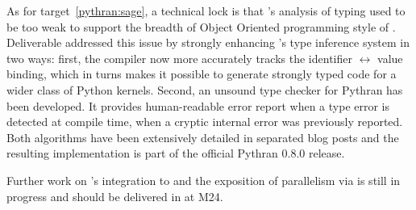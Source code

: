 \documentclass{deliverablereport}
\begin{document}
As for target~\ref{pythran:sage}, a technical lock is that \Pythran's analysis
of \Python typing used to be too weak to support the breadth of Object Oriented
programming style of \Sage. Deliverable 
addressed this issue by strongly enhancing \Pythran's type inference system in two ways: first, the compiler now more accurately tracks the identifier
$\leftrightarrow$ value binding, which in turns makes it possible to generate strongly
typed code for a wider class of Python kernels.  Second, an unsound type checker for
Pythran has been developed. It provides human-readable error report when a type error is
detected at compile time, when a cryptic internal error was previously reported. Both
algorithms have been extensively detailed in separated blog posts and the resulting
implementation is part of the official Pythran 0.8.0 release.

Further work on \Pythran's integration to \Sage and the exposition of
parallelism via  is still in progress and should be delivered in
 at M24.

  \paragraph{}
  

  
\end{document}
